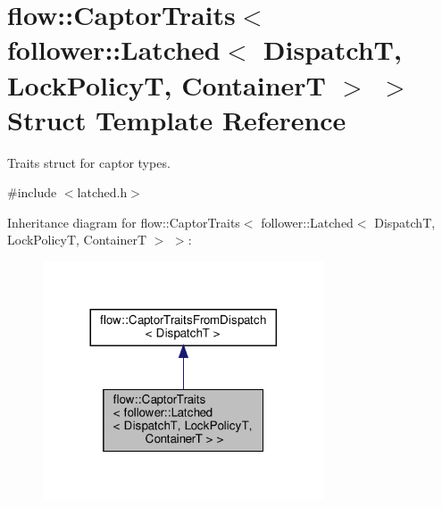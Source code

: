 \hypertarget{structflow_1_1_captor_traits_3_01follower_1_1_latched_3_01_dispatch_t_00_01_lock_policy_t_00_01_container_t_01_4_01_4}{}\section{flow\+:\+:Captor\+Traits$<$ follower\+:\+:Latched$<$ DispatchT, Lock\+PolicyT, ContainerT $>$ $>$ Struct Template Reference}
\label{structflow_1_1_captor_traits_3_01follower_1_1_latched_3_01_dispatch_t_00_01_lock_policy_t_00_01_container_t_01_4_01_4}


Traits struct for captor types.  




{\ttfamily \#include $<$latched.\+h$>$}



Inheritance diagram for flow\+:\+:Captor\+Traits$<$ follower\+:\+:Latched$<$ DispatchT, Lock\+PolicyT, ContainerT $>$ $>$\+:\nopagebreak
\begin{figure}[H]
\begin{center}
\leavevmode
\includegraphics[width=236pt]{structflow_1_1_captor_traits_3_01follower_1_1_latched_3_01_dispatch_t_00_01_lock_policy_t_00_01_addc158af6f19dd14dbb9f5db2ef3aa0}
\end{center}
\end{figure}


